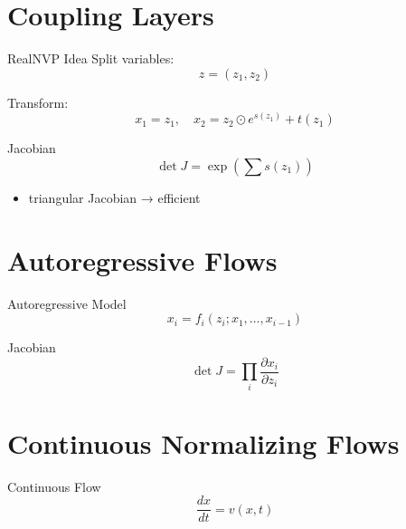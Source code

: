 \documentclass{beamer}
\begin{document}
\section{Coupling Layers}

\begin{frame}{RealNVP Idea}
Split variables:
\[
z = (z_1, z_2)
\]

Transform:
\[
x_1 = z_1, \quad x_2 = z_2 \odot e^{s(z_1)} + t(z_1)
\]
\end{frame}


\begin{frame}{Jacobian}
\[
\det J = \exp\left(\sum s(z_1)\right)
\]

\begin{itemize}
\item triangular Jacobian → efficient
\end{itemize}
\end{frame}

\section{Autoregressive Flows}

\begin{frame}{Autoregressive Model}
\[
x_i = f_i(z_i; x_1,\dots,x_{i-1})
\]
\end{frame}


\begin{frame}{Jacobian}
\[
\det J = \prod_i \frac{\partial x_i}{\partial z_i}
\]
\end{frame}

\section{Continuous Normalizing Flows}

\begin{frame}{Continuous Flow}
\[
\frac{dx}{dt} = v(x,t)
\]
\end{frame}

\end{document}
